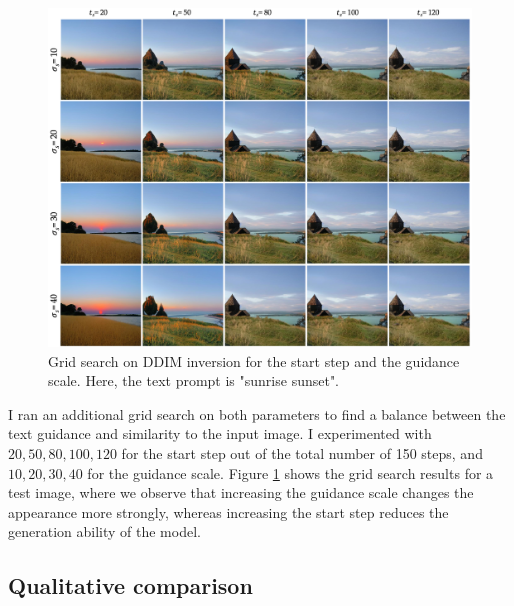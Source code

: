 \begin{figure}[ht]
  \includegraphics[width=\textwidth]{Chapters/zero-shot-tat-figs/grid-search.png}
  \caption{Grid search on DDIM inversion for the start step and the guidance scale. Here, the text prompt is "sunrise sunset".}
  \label{fig:zero-shot-grid-search}
\end{figure}

I ran an additional grid search on both parameters to find a balance between the text guidance and similarity to the input image. I experimented with $20, 50, 80, 100, 120$ for the start step out of the total number of 150 steps, and $10, 20, 30, 40$ for the guidance scale. Figure \ref{fig:zero-shot-grid-search} shows the grid search results for a test image, where we observe that increasing the guidance scale changes the appearance more strongly, whereas increasing the start step reduces the generation ability of the model.



\subsection{Qualitative comparison}
